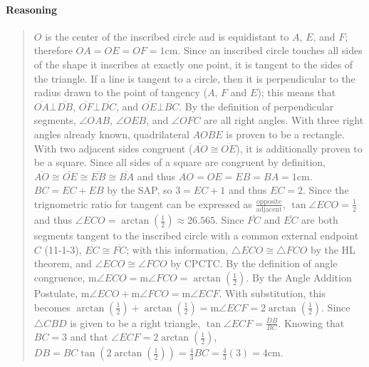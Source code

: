 \documentclass[letterpaper,12pt,twoside]{report}
\begin{document}
	\paragraph{Reasoning}
	\begin{quotation}
		
		$O$ is the center of the inscribed circle and is equidistant to $A$, $E$, and $F$; therefore $OA=OE=OF=1 \text{cm}$. Since an inscribed circle touches all sides of the shape it inscribes at exactly one point, it is tangent to the sides of the triangle. If a line is tangent to a circle, then it is perpendicular to the radius drawn to the point of tangency ($A$, $F$ and $E$); this means that $\overline{OA} \bot \overline{DB}$, $\overline{OF} \bot \overline{DC}$, and $\overline{OE} \bot \overline{BC}$. By the definition of perpendicular segments, $\angle OAB$, $\angle OEB$, and $\angle OFC$ are all right angles. With three right angles already known, quadrilateral $AOBE$ is proven to be a rectangle. With two adjacent sides congruent ($\overline{AO} \cong \overline{OE}$), it is additionally proven to be a square. Since all sides of a square are congruent by definition, $\overline{AO}\cong \overline{OE}\cong \overline{EB}\cong \overline{BA}$ and thus $AO=OE=EB=BA=1 \text{cm}$. $BC=EC+EB$ by the SAP, so $3=EC+1$ and thus $EC=2$. Since the trignometric ratio for tangent can be expressed as $\frac{\text{opposite}}{\text{adjacent}}$, $\tan \angle ECO = \frac{1}{2}$ and thus $\angle ECO=\arctan (\frac{1}{2}) \approx 26.565$\textdegree. Since $\overline{FC}$ and $\overline{EC}$ are both segments tangent to the inscribed circle with a common external endpoint $C$ (11-1-3), $\overline{EC}\cong \overline{FC}$; with this information, $\triangle ECO \cong \triangle FCO$ by the HL theorem, and $\angle ECO \cong \angle FCO$ by CPCTC. By the definition of angle congruence, $\text{m}\angle ECO = \text{m}\angle FCO = \arctan (\frac{1}{2}) $. By the Angle Addition Postulate, $\text{m}\angle ECO+\text{m}\angle FCO=\text{m}\angle ECF$. With substitution, this becomes $\arctan (\frac{1}{2}) + \arctan (\frac{1}{2}) = \text{m}\angle ECF=2\arctan (\frac{1}{2})$. Since $\triangle CBD$ is given to be a right triangle, $\tan \angle ECF = \frac{DB}{BC}$. Knowing that $BC=3$ and that $\angle ECF=2\arctan (\frac{1}{2})$, $DB=BC \tan (2 \arctan (\frac{1}{2}))=\frac{4}{3}BC=\frac{4}{3}(3)=\boxed{4 \text{cm}}$. 
		
	\end{quotation}
	
\end{document}
